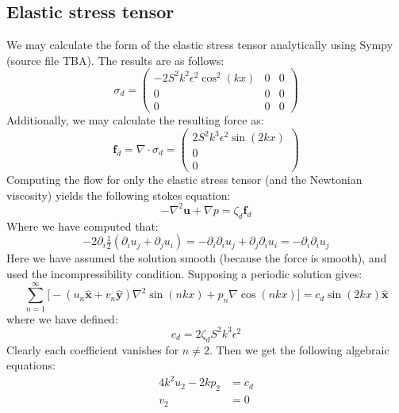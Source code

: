 \documentclass[reqno]{article}
\begin{document}
\subsection{Elastic stress tensor}
We may calculate the form of the elastic stress tensor analytically using Sympy
(source file TBA).
The results are as follows:
\begin{equation}
  \sigma_d
  =
  \begin{pmatrix}
    -2 S^2 k^2 \epsilon^2 \cos^2(kx) & 0 & 0 \\
    0 & 0 & 0 \\
    0 & 0 & 0
  \end{pmatrix}
\end{equation}
Additionally, we may calculate the resulting force as:
\begin{equation}
  \mathbf{f}_d
  =
  \nabla \cdot \sigma_d
  =
  \begin{pmatrix}
    2 S^2 k^3 \epsilon^2 \sin(2kx) \\
    0 \\
    0
  \end{pmatrix}
\end{equation}
Computing the flow for only the elastic stress tensor (and the Newtonian
viscosity) yields the following stokes equation:
\begin{equation} \label{eq:elastic-periodic-stokes}
  -\nabla^2 \mathbf{u} + \nabla p
  =
  \zeta_d \mathbf{f}_d
\end{equation}
Where we have computed that:
\begin{equation}
  -2 \partial_i \tfrac12 \left( \partial_i u_j + \partial_j u_i \right)
  =
  - \partial_i \partial_i u_j + \partial_j \partial_i u_i
  =
  - \partial_i \partial_i u_j
\end{equation}
Here we have assumed the solution smooth (because the force is smooth), and used
the incompressibility condition.
Supposing a periodic solution gives:
\begin{equation}
  \sum_{n = 1}^\infty \biggl[  -(u_n \mathbf{\hat{x}} + v_n \mathbf{\hat{y}}) \nabla^2 \sin(n k x) 
  +  p_n\nabla \cos(n k x) \biggr]
  =
  c_d \sin(2kx) \mathbf{\hat{x}}
\end{equation}
where we have defined:
\begin{equation}
  c_d = 2 \zeta_d S^2 k^3 \epsilon^2
\end{equation}
Clearly each coefficient vanishes for $n \neq 2$.
Then we get the following algebraic equations:
\begin{equation}
\begin{split}
  4 k^2 u_2 - 2 k p_2 &= c_d \\
  v_2 &= 0
\end{split}
\end{equation}
\end{document}
